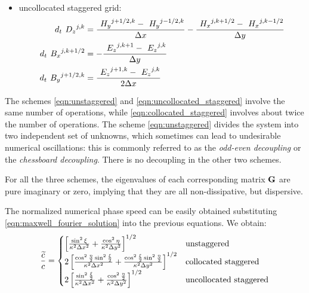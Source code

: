 \begin{itemize}
\begin{equation}
\begin{split}
  \end{split} \end{equation}
\item
  uncollocated staggered grid:
  \begin{equation} \label{eqn:uncollocated_staggered} \begin{split}
  d_t {\ }^{}{D_z}^{j,k} & = \frac{{\ }^{}{H_y}^{j+1/2,k} -
  {\ }^{}{H_y}^{j-1/2,k}}{\Delta x} - \frac{{\ }^{}{H_x}^{j,k+1/2} -
  {\ }^{}{H_x}^{j,k-1/2}}{\Delta y}  \\
  d_t {\ }^{}{B_x}^{j,k+1/2} & = - \frac{{\ }^{}{E_z}^{j,k+1} -
  {\ }^{}{E_z}^{j,k}}{\Delta y} \\
  d_t {\ }^{}{B_y}^{j+1/2,k} & = \frac{{\ }^{}{E_z}^{j+1,k} -
  {\ }^{}{E_z}^{j,k}}{2\Delta x}
  \end{split} \end{equation}
\end{itemize}

The schemes \eqref{eqn:unstaggered} and
\eqref{eqn:uncollocated_staggered} involve the same number of
operations, while \eqref{eqn:collocated_staggered} involves about twice
the number of operations. The scheme \eqref{eqn:unstaggered} divides
the system into two independent set of unknowns, which sometimes can
lead to undesirable numerical oscillations: this is commonly referred
to as the \emph{odd-even decoupling} or the \emph{chessboard
  decoupling}. There is no decoupling in the other two schemes.

For all the three schemes, the eigenvalues of each corresponding
matrix $\mathbf{G}$ are pure imaginary or zero, implying that they
are all non-dissipative, but dispersive.

The normalized numerical phase speed can be easily obtained
substituting \eqref{eqn:maxwell_fourier_solution} into the previous
equations. We obtain:
\begin{equation} \label{eqn:numerical_c}
\frac{\widetilde{c}}{c} = \begin{cases}
  \left[ \frac{\sin^2 \xi}{\kappa^2 \Delta x^2} + \frac{\cos^2
  \eta}{\kappa^2 \Delta y^2} \right]^{1/2} & \text{unstaggered} \\
  2\left[ \frac{\cos^2 \frac{\eta}{2} \sin^2 \frac{\xi}{2}}{\kappa^2
  \Delta x^2} + \frac{\cos^2 \frac{\xi}{2} \sin^2
  \frac{\eta}{2}}{\kappa^2 \Delta y^2} \right]^{1/2} &
  \text{collocated staggered} \\
  2\left[ \frac{\sin^2 \frac{\xi}{2}}{\kappa^2 \Delta x^2} + \frac{\cos^2
  \frac{\eta}{2}}{\kappa^2 \Delta y^2} \right]^{1/2} &
  \text{uncollocated staggered}
  \end{cases}
\end{equation}

